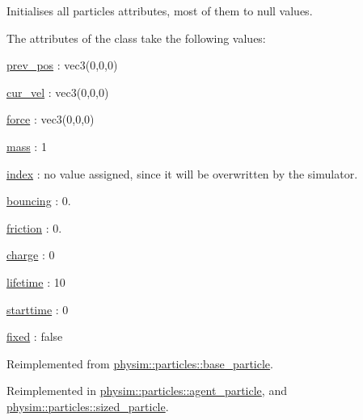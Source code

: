 Initialises all particle\textquotesingle{}s attributes, most of them to null values. 

The attributes of the class take the following values\+:
\begin{DoxyItemize}
\item \hyperlink{classphysim_1_1particles_1_1base__particle_a08072db6a1a59d21acc9cac6ac8965f7}{prev\+\_\+pos} \+: vec3(0,0,0)
\item \hyperlink{classphysim_1_1particles_1_1base__particle_a66a164d2a130c40901e3ec2709cdad43}{cur\+\_\+vel} \+: vec3(0,0,0)
\item \hyperlink{classphysim_1_1particles_1_1base__particle_adc3b11899d2e50970ae5d4931721a0ef}{force} \+: vec3(0,0,0)
\item \hyperlink{classphysim_1_1particles_1_1base__particle_acb5c9f0b4a911d8981210e2cfc4dda8a}{mass} \+: 1
\item \hyperlink{classphysim_1_1particles_1_1base__particle_a44f5de3bb4b860dfd511e28e1d6519d5}{index} \+: no value assigned, since it will be overwritten by the simulator.
\item \hyperlink{classphysim_1_1particles_1_1free__particle_aac766fa5294e47b944d32ca3e38d47fa}{bouncing} \+: 0.
\item \hyperlink{classphysim_1_1particles_1_1free__particle_a9e7dfd81e9392fc42b3faecb57afdc02}{friction} \+: 0.
\item \hyperlink{classphysim_1_1particles_1_1free__particle_a7513ac41f3cab1ce083f8695e2c73301}{charge} \+: 0
\item \hyperlink{classphysim_1_1particles_1_1free__particle_a5870d6fd3167d2c6120f887f45fe50fc}{lifetime} \+: 10
\item \hyperlink{classphysim_1_1particles_1_1free__particle_ad0379ba926ecc909bfbfb373045bfcf9}{starttime} \+: 0
\item \hyperlink{classphysim_1_1particles_1_1free__particle_a0f6d69caeac140abd74c7be4ed55eb74}{fixed} \+: false 
\end{DoxyItemize}

Reimplemented from \hyperlink{classphysim_1_1particles_1_1base__particle_a3bba517d51fd0bff7ec583e701765f87}{physim\+::particles\+::base\+\_\+particle}.



Reimplemented in \hyperlink{classphysim_1_1particles_1_1agent__particle_ac13082909f480fc55d406321c77d38b1}{physim\+::particles\+::agent\+\_\+particle}, and \hyperlink{classphysim_1_1particles_1_1sized__particle_a63de84961417c1522c0ca576697cd972}{physim\+::particles\+::sized\+\_\+particle}.

